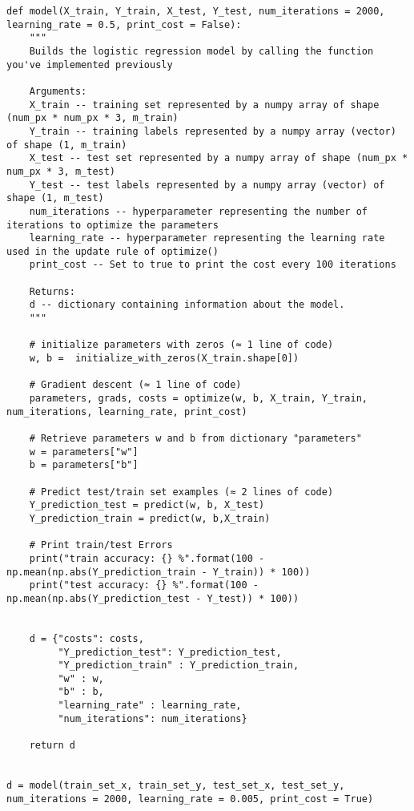 \begin{verbatim}
def model(X_train, Y_train, X_test, Y_test, num_iterations = 2000, learning_rate = 0.5, print_cost = False):
    """
    Builds the logistic regression model by calling the function you've implemented previously
    
    Arguments:
    X_train -- training set represented by a numpy array of shape (num_px * num_px * 3, m_train)
    Y_train -- training labels represented by a numpy array (vector) of shape (1, m_train)
    X_test -- test set represented by a numpy array of shape (num_px * num_px * 3, m_test)
    Y_test -- test labels represented by a numpy array (vector) of shape (1, m_test)
    num_iterations -- hyperparameter representing the number of iterations to optimize the parameters
    learning_rate -- hyperparameter representing the learning rate used in the update rule of optimize()
    print_cost -- Set to true to print the cost every 100 iterations
    
    Returns:
    d -- dictionary containing information about the model.
    """
    
    # initialize parameters with zeros (≈ 1 line of code)
    w, b =  initialize_with_zeros(X_train.shape[0])

    # Gradient descent (≈ 1 line of code)
    parameters, grads, costs = optimize(w, b, X_train, Y_train, num_iterations, learning_rate, print_cost)
    
    # Retrieve parameters w and b from dictionary "parameters"
    w = parameters["w"]
    b = parameters["b"]
    
    # Predict test/train set examples (≈ 2 lines of code)
    Y_prediction_test = predict(w, b, X_test)
    Y_prediction_train = predict(w, b,X_train)

    # Print train/test Errors
    print("train accuracy: {} %".format(100 - np.mean(np.abs(Y_prediction_train - Y_train)) * 100))
    print("test accuracy: {} %".format(100 - np.mean(np.abs(Y_prediction_test - Y_test)) * 100))

    
    d = {"costs": costs,
         "Y_prediction_test": Y_prediction_test, 
         "Y_prediction_train" : Y_prediction_train, 
         "w" : w, 
         "b" : b,
         "learning_rate" : learning_rate,
         "num_iterations": num_iterations}
    
    return d


d = model(train_set_x, train_set_y, test_set_x, test_set_y, num_iterations = 2000, learning_rate = 0.005, print_cost = True)
\end{verbatim}

\clearpage
